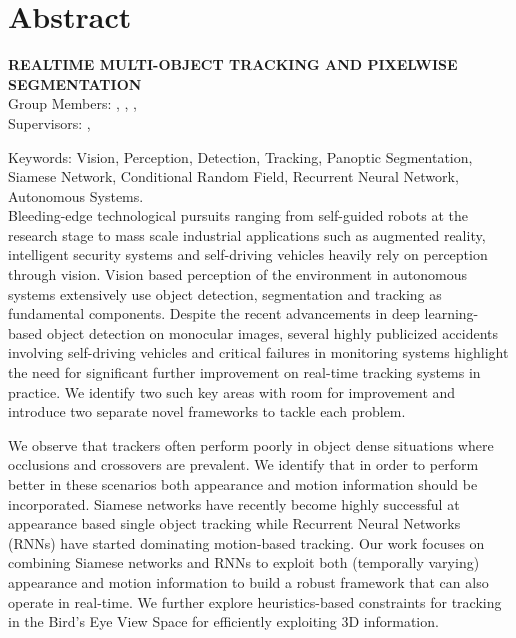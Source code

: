 \chapter*{Abstract}

\begin{center}
	\vspace{5mm}
	\MakeUppercase{\textbf{Realtime Multi-Object Tracking and Pixelwise Segmentation}}\\
	\vspace{5mm}
	Group Members: \memberA, \memberB, \memberC, \memberD \\
	\vspace{5mm}
	Supervisors: \supervisorA, \supervisorB \\
	\vspace{5mm}
\end{center}

\noindent Keywords: Vision, Perception, Detection, Tracking, Panoptic Segmentation, Siamese Network, Conditional Random Field, Recurrent Neural Network, Autonomous Systems. \\

Bleeding-edge technological pursuits ranging from self-guided robots at the research stage to mass scale industrial applications such as augmented reality, intelligent security systems and self-driving vehicles heavily rely on perception through vision. Vision based perception of the environment in autonomous systems extensively use object detection, segmentation and tracking as fundamental components. Despite the recent advancements in deep learning-based object detection on monocular images, several highly publicized accidents involving self-driving vehicles and critical failures in monitoring systems highlight the need for significant further improvement on real-time tracking systems in practice. We identify two such key areas with room for improvement and introduce two separate novel frameworks to tackle each problem. 

We observe that trackers often perform poorly in object dense situations where occlusions and crossovers are prevalent. We identify that in order to perform better in these scenarios both appearance and motion information should be incorporated. Siamese networks have recently become highly successful at appearance based single object tracking while Recurrent Neural Networks (RNNs) have started dominating motion-based tracking. Our work focuses on combining Siamese networks and RNNs to exploit both (temporally varying) appearance and motion information to build a robust framework that can also operate in real-time. We further explore heuristics-based constraints for tracking in the Bird’s Eye View Space for efficiently exploiting 3D information.

